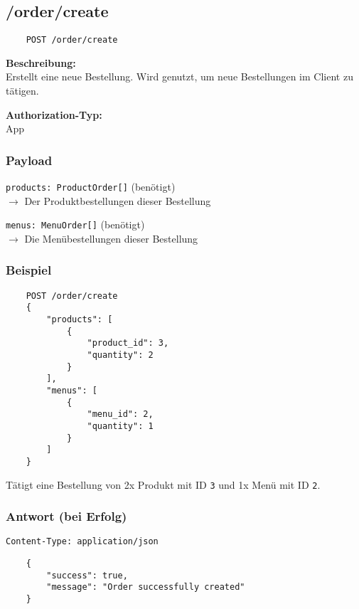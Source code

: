 \subsection{/order/create}

\begin{lstlisting}
    POST /order/create
\end{lstlisting}

\textbf{Beschreibung:} \\
Erstellt eine neue Bestellung. Wird genutzt, um neue Bestellungen im Client zu tätigen.

\textbf{Authorization-Typ:} \\
App

\subsubsection{Payload}

\lstinline{products: ProductOrder[]} (benötigt) \\
$\rightarrow$ Der Produktbestellungen dieser Bestellung

\lstinline{menus: MenuOrder[]} (benötigt) \\
$\rightarrow$ Die Menübestellungen dieser Bestellung

\subsubsection{Beispiel}

\begin{lstlisting}
    POST /order/create
    {
        "products": [
            {
                "product_id": 3,
                "quantity": 2
            }
        ],
        "menus": [
            {
                "menu_id": 2,
                "quantity": 1
            }
        ]
    }
\end{lstlisting}

Tätigt eine Bestellung von 2x Produkt mit ID \lstinline{3} und 1x Menü mit ID \lstinline{2}.

\subsubsection{Antwort (bei Erfolg)}

\lstinline{Content-Type: application/json}
\begin{lstlisting}
    {
        "success": true, 
        "message": "Order successfully created"
    }
\end{lstlisting}
